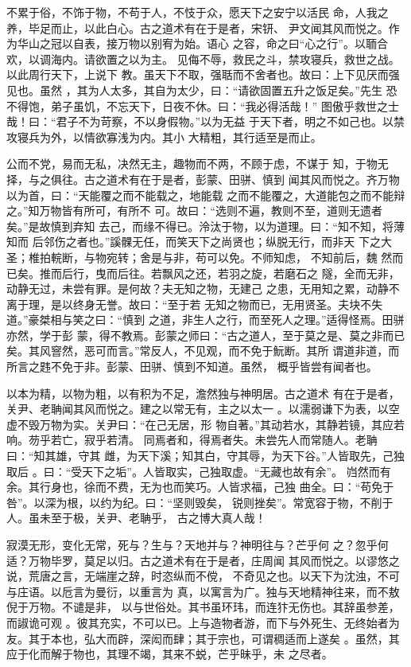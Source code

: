 \documentclass[12pt,UTF8]{ctexbook}
\begin{document}
不累于俗，不饰于物，不苟于人，不忮于众，愿天下之安宁以活民 命，人我之养，毕足而止，以此白心。古之道术有在于是者，宋钘、 尹文闻其风而悦之。作为华山之冠以自表，接万物以别宥为始。语心 之容，命之曰“心之行”。以聏合欢，以调海内。请欲置之以为主。 见侮不辱，救民之斗，禁攻寝兵，救世之战。以此周行天下，上说下 教。虽天下不取，强聒而不舍者也。故曰：上下见厌而强见也。虽然 ，其为人太多，其自为太少，曰：“请欲固置五升之饭足矣。”先生 恐不得饱，弟子虽饥，不忘天下，日夜不休。曰：“我必得活哉！” 图傲乎救世之士哉！曰：“君子不为苛察，不以身假物。”以为无益 于天下者，明之不如己也。以禁攻寝兵为外，以情欲寡浅为内。其小 大精粗，其行适至是而止。

公而不党，易而无私，决然无主，趣物而不两，不顾于虑，不谋于 知，于物无择，与之俱往。古之道术有在于是者，彭蒙、田骈、慎到 闻其风而悦之。齐万物以为首，曰：“天能覆之而不能载之，地能载 之而不能覆之，大道能包之而不能辩之。”知万物皆有所可，有所不 可。故曰：“选则不遍，教则不至，道则无遗者矣。”是故慎到弃知 去己，而缘不得已。泠汰于物，以为道理。曰：“知不知，将薄知而 后邻伤之者也。”謑髁无任，而笑天下之尚贤也；纵脱无行，而非天 下之大圣；椎拍輐断，与物宛转；舍是与非，苟可以免。不师知虑， 不知前后，魏 然而已矣。推而后行，曳而后往。若飘风之还，若羽之旋，若磨石之 隧，全而无非，动静无过，未尝有罪。是何故？夫无知之物，无建己 之患，无用知之累，动静不离于理，是以终身无誉。故曰：“至于若 无知之物而已，无用贤圣。夫块不失道。”豪桀相与笑之曰：“慎到 之道，非生人之行，而至死人之理。”适得怪焉。田骈亦然，学于彭 蒙，得不教焉。彭蒙之师曰：“古之道人，至于莫之是、莫之非而已 矣。其风窨然，恶可而言。”常反人，不见观，而不免于魭断。其所 谓道非道，而所言之韪不免于非。彭蒙、田骈、慎到不知道。虽然， 概乎皆尝有闻者也。

以本为精，以物为粗，以有积为不足，澹然独与神明居。古之道术 有在于是者，关尹、老聃闻其风而悦之。建之以常无有，主之以太一 。以濡弱谦下为表，以空虚不毁万物为实。关尹曰：“在己无居，形 物自著。”其动若水，其静若镜，其应若响。芴乎若亡，寂乎若清。 同焉者和，得焉者失。未尝先人而常随人。老聃曰：“知其雄，守其 雌，为天下溪；知其白，守其辱，为天下谷。”人皆取先，己独取后 。曰：“受天下之垢”。人皆取实，己独取虚。“无藏也故有余”。 岿然而有余。其行身也，徐而不费，无为也而笑巧。人皆求福，己独 曲全。曰：“苟免于咎”。以深为根，以约为纪。曰：“坚则毁矣， 锐则挫矣”。常宽容于物，不削于人。虽未至于极，关尹、老聃乎， 古之博大真人哉！

寂漠无形，变化无常，死与？生与？天地并与？神明往与？芒乎何 之？忽乎何适？万物毕罗，莫足以归。古之道术有在于是者，庄周闻 其风而悦之。以谬悠之说，荒唐之言，无端崖之辞，时恣纵而不傥， 不奇见之也。以天下为沈浊，不可与庄语。以卮言为曼衍，以重言为 真，以寓言为广。独与天地精神往来，而不敖倪于万物。不谴是非， 以与世俗处。其书虽环玮，而连犿无伤也。其辞虽参差，而諔诡可观 。彼其充实，不可以已。上与造物者游，而下与外死生、无终始者为 友。其于本也，弘大而辟，深闳而肆；其于宗也，可谓稠适而上遂矣 。虽然，其应于化而解于物也，其理不竭，其来不蜕，芒乎昧乎，未 之尽者。
\end{document}
